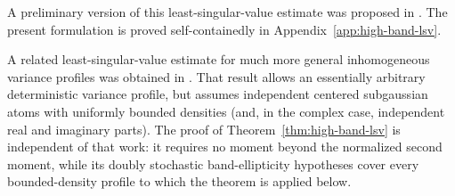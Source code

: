 \documentclass[11pt,reqno]{amsart}
\numberwithin{equation}{section}
\theoremstyle{definition}
\theoremstyle{remark}
\newcommand{\1}{\mathbf 1}
\begin{document}
A preliminary version of this least-singular-value estimate was proposed
in \cite{Han2508}.  The present formulation is proved self-containedly in
Appendix~\ref{app:high-band-lsv}.

A related least-singular-value estimate for much more general
inhomogeneous variance profiles was obtained in
\cite[Theorem~3.4]{Tikhomirov2023}.  That result allows an essentially
arbitrary deterministic variance profile, but assumes independent centered
subgaussian atoms with uniformly bounded densities (and, in the complex
case, independent real and imaginary parts).  The proof of
Theorem~\ref{thm:high-band-lsv} is independent of that work: it requires no
moment beyond the normalized second moment, while its doubly stochastic
band-ellipticity hypotheses cover every bounded-density profile to which
the theorem is applied below.
\end{document}
